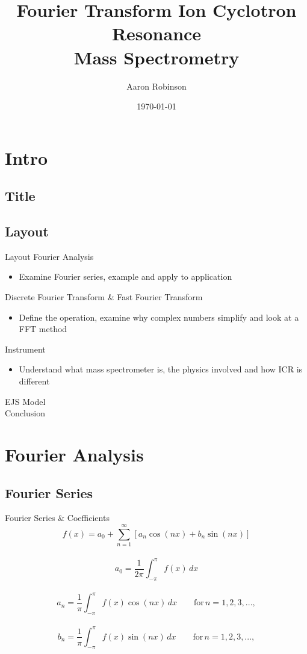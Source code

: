 \documentclass[t,compress,athserif,xcolor=pst,dvips]{beamer}
\title{Fourier Transform Ion Cyclotron Resonance\\ Mass Spectrometry}
\author{Aaron Robinson}
\institute{\large High Point University}
\date{\today}
\begin{document}
	\section{Intro}

	\subsection{Title}
	\frame{\titlepage}
	
	\subsection{Layout}
	\begin{frame}[c]{Layout}
		Fourier Analysis \\
		\begin{itemize} \itemsep2pt
			\item Examine Fourier series, example and apply to application
		\end{itemize}
		Discrete Fourier Transform \& Fast Fourier Transform\\
		\begin{itemize} \itemsep2pt
			\item Define the operation, examine why complex numbers simplify and look at a FFT method
		\end{itemize}
		Instrument \\ %
		\begin{itemize} \itemsep2pt
			\item Understand what mass spectrometer is, the physics involved and how ICR is different
		\end{itemize}
		EJS Model \\[5pt]
		Conclusion
	\end{frame}	
	
	\section{Fourier Analysis}

	\subsection{Fourier Series}
	\begin{frame}[c]{Fourier Series \& Coefficients}
		$$f(x)=a_0 + \displaystyle\sum_{n=1}^{\infty}{[a_n\cos(nx) + b_n\sin(nx)]}$$ \\ \vspace{4pt} \pause
		$$a_0 = \frac{1}{2\pi}\int_{-\pi}^{\pi}f(x) \,dx $$ \\ \vspace{4pt} 
		$$a_n = \frac{1}{\pi}\int_{-\pi}^{\pi}f(x)\cos(nx) \,dx \qquad \mathrm{for}\, n = 1, 2, 3,...,$$ \\ \vspace{4pt}
		$$b_n = \frac{1}{\pi}\int_{-\pi}^{\pi}f(x)\sin(nx) \,dx \qquad \mathrm{for}\, n = 1, 2, 3,...,$$
	\end{frame}
	
\end{document}
